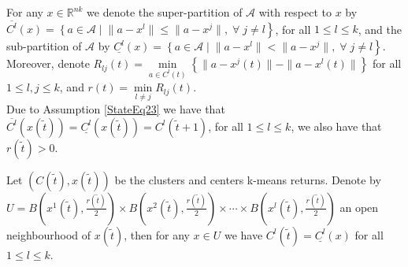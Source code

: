 For any $x \in \mathbb{R}^{nk}$ we denote the super-partition of $\mathcal{A}$ with respect to $x$ by $\overline{C^l}(x) = \left\lbrace a \in \mathcal{A} \mid \right. \left. \|a - x^l\| \leq \|a - x^j\| , \; \forall \; j \neq l \right\rbrace$, for all $1 \leq l \leq k$, and the sub-partition of $\mathcal{A}$ by $\underline{C^l}(x) = \left\lbrace a \in \mathcal{A} \mid \right. \left. \|a - x^l\| < \|a - x^j\|, \; \forall \; j \neq l \right\rbrace$.
Moreover, denote $R_{lj}(t) = \min\limits_{a \in C^l(t)} \left\lbrace \|a - x^j(t)\| - \|a - x^l(t)\| \right\rbrace$ for all $1 \leq l,j \leq k$, and $r(t) = \min\limits_{l \neq j} R_{lj}(t)$. \\
Due to Assumption \ref{StateEq23} we have that $\overline{C^l}(x(\widetilde{t})) = \underline{C^l}(x(\widetilde{t})) = C^l(\widetilde{t}+1)$, for all $1 \leq l \leq k$, we also have that $r(\widetilde{t}) > 0$.

\begin{proposition} \label{StateEq24}
Let $(C(\widetilde{t}), x(\widetilde{t}))$ be the clusters and centers k-means returns. Denote by $U = B\left( x^1(\widetilde{t}),\frac{r(\widetilde{t})}{2}\right) \times  B\left( x^2(\widetilde{t}),\frac{r(\widetilde{t})}{2}\right) \times \cdots \times B\left( x^l(\widetilde{t}),\frac{r(\widetilde{t})}{2} \right)$ an open neighbourhood of $x(\widetilde{t})$, then for any $x \in U$ we have $C^l(\widetilde{t}) = \underline{C^l}(x)$ for all $1 \leq l \leq k$.
\end{proposition}

